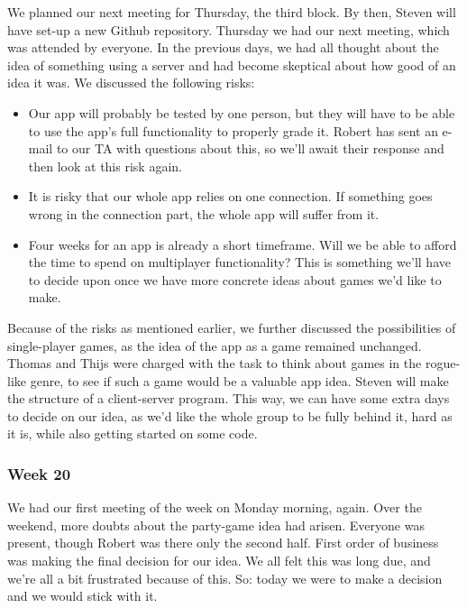\documentclass[../main.tex]{subfiles}
\begin{document}
We planned our next meeting for Thursday, the third block. By then, Steven will have set-up a new Github repository.
\bigbreak\noindent
Thursday we had our next meeting, which was attended by everyone. In the previous days, we had all thought about the idea of something using a server and had become skeptical about how good of an idea it was. We discussed the following risks:
\begin{itemize}
	\item Our app will probably be tested by one person, but they will have to be able to use the app's full functionality to properly grade it. Robert has sent an e-mail to our TA with questions about this, so we'll await their response and then look at this risk again.
		\item It is risky that our whole app relies on one connection. If something goes wrong in the connection part, the whole app will suffer from it.
		\item Four weeks for an app is already a short timeframe. Will we be able to afford the time to spend on multiplayer functionality? This is something we'll have to decide upon once we have more concrete ideas about games we'd like to make.
\end{itemize}
Because of the risks as mentioned earlier, we further discussed the possibilities of single-player games, as the idea of the app as a game remained unchanged. Thomas and Thijs were charged with the task to think about games in the rogue-like genre, to see if such a game would be a valuable app idea. Steven will make the structure of a client-server program. This way, we can have some extra days to decide on our idea, as we'd like the whole group to be fully behind it, hard as it is, while also getting started on some code.


\subsubsection*{Week 20}
We had our first meeting of the week on Monday morning, again. Over the weekend, more doubts about the party-game idea had arisen. Everyone was present, though Robert was there only the second half. First order of business was making the final decision for our idea. We all felt this was long due, and we're all a bit frustrated because of this. So: today we were to make a decision and we would stick with it.
\end{document}
